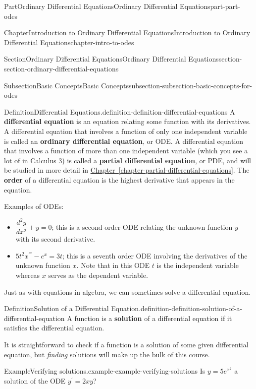 \documentclass[twoside,10pt,]{book}
\newcommand{\xreffont}{\relax}
\newcommand{\terminology}[1]{\textbf{#1}}
\numberwithin{equation}{part}
\newcommand{\dv}[3][]{\dfrac{d^{#1} #2}{d #3^{#1}}}
\begin{document}
\begin{partptx}{Part}{Ordinary Differential Equations}{}{Ordinary Differential Equations}{}{}{part-part-odes}
\begin{chapterptx}{Chapter}{Introduction to Ordinary Differential Equations}{}{Introduction to Ordinary Differential Equations}{}{}{chapter-intro-to-odes}
\begin{sectionptx}{Section}{Ordinary Differential Equations}{}{Ordinary Differential Equations}{}{}{section-section-ordinary-differential-equations}
\begin{subsectionptx}{Subsection}{Basic Concepts}{}{Basic Concepts}{}{}{subsection-subsection-basic-concepts-for-odes}
\begin{definition}{Definition}{Differential Equations.}{definition-definition-differential-equations}%
%
A \terminology{differential equation} is an equation relating some function with its derivatives. A differential equation that involves a function of only one independent variable is called an \terminology{ordinary differential equation}, or ODE. A differential equation that involves a function of more than one independent variable (which you see a lot of in Calculus 3) is called a \terminology{partial differential equation}, or PDE, and will be studied in more detail in \hyperref[chapter-partial-differential-equations]{Chapter~{\xreffont\ref{chapter-partial-differential-equations}}}. The \terminology{order} of a differential equation is the highest derivative that appears in the equation.%
\end{definition}
Examples of ODEs:%
\begin{itemize}[label=\textbullet]
\item{}\(\dv[2]{y}{x} + y = 0\); this is a second order ODE relating the unknown function \(y\) with its second derivative.%
\item{}\(5t^{2}x^{'''} - e^{x} = 3t\); this is a seventh order ODE involving the derivatives of the unknown function \(x\). Note that in this ODE \(t\) is the independent variable whereas \(x\) serves as the dependent variable.%
\end{itemize}
%
\par
Just as with equations in algebra, we can sometimes solve a differential equation.%
\begin{definition}{Definition}{Solution of a Differential Equation.}{definition-definition-solution-of-a-differential-equation}%
%
A function is a \terminology{solution} of a differential equation if it satisfies the differential equation.%
\end{definition}
It is straightforward to check if a function is a solution of some given differential equation, but \emph{finding} solutions will make up the bulk of this course.%
\begin{example}{Example}{Verifying solutions.}{example-example-verifying-solutions}%
Is \(y = 5e^{x^{2}}\) a solution of the ODE \(y^\prime= 2xy\)?%
\par\smallskip%

\end{example}
\end{subsectionptx}
\end{sectionptx}
\end{chapterptx}
\end{partptx}
\end{document}
